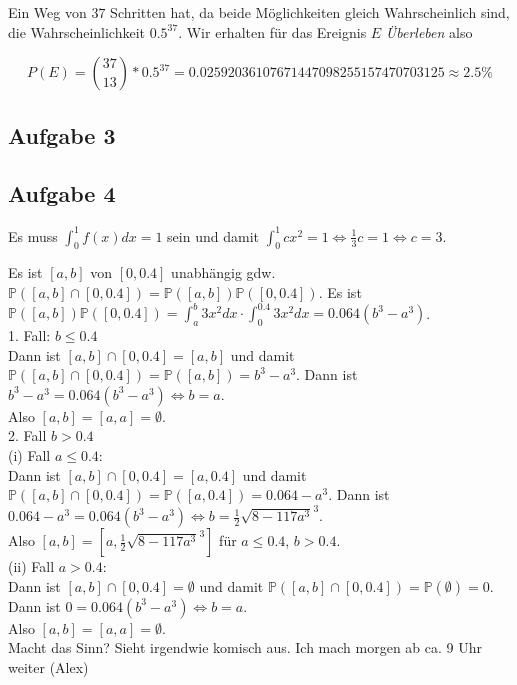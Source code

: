 \documentclass[11pt,a4paper,ngerman]{article}
\newcommand{\Prob}{\mathbb{P}}
\begin{document}
Ein Weg von $37$ Schritten hat, da beide Möglichkeiten gleich Wahrscheinlich sind, die Wahrscheinlichkeit $0.5^{37}$. Wir erhalten für
das Ereignis $E$ \emph{Überleben} also

\[
    P(E) = \binom{37}{13} * 0.5^{37} = 0.02592036107671447098255157470703125 \approx 2.5\%
\]

\subsection*{Aufgabe 3}


\subsection*{Aufgabe 4}

Es muss $\int_0^1 f(x) dx = 1$ sein und damit $\int_0^1 c x^2 = 1 \Leftrightarrow \frac{1}{3}c = 1 \Leftrightarrow c = 3$.

Es ist $[a,b]$ von $[0,0.4]$ unabhängig gdw. $\Prob([a,b] \cap [0,0.4]) = \Prob([a,b]) \Prob([0,0.4])$.
Es ist $\Prob([a,b]) \Prob([0,0.4]) = \int_a^b 3x^2 dx \cdot \int_0^{0.4} 3x^2 dx = 0.064 (b^3 - a^3)$. \\

1. Fall: $b \leq 0.4$ \\
Dann ist $[a,b] \cap [0,0.4] = [a,b]$ und damit $\Prob([a,b] \cap [0,0.4]) = \Prob([a,b]) = b^3 - a^3$.
Dann ist $ b^3 - a^3 =  0.064 (b^3 - a^3) \Leftrightarrow b = a$. \\
Also $[a,b] = [a,a] = \emptyset$. \\

2. Fall $b > 0.4$ \\
(i) Fall $a \leq 0.4$: \\
Dann ist $[a,b] \cap [0,0.4] = [a, 0.4]$ und damit  $\Prob([a,b] \cap [0,0.4]) = \Prob([a,0.4]) = 0.064 - a^3$.
Dann ist $ 0.064 - a^3 =  0.064 (b^3 - a^3) \Leftrightarrow b = \frac{1}{2} \sqrt{8-117a^3}^3$. \\
Also $[a,b] = [a,\frac{1}{2} \sqrt{8-117a^3}^3]$ für $a \leq 0.4$, $b > 0.4$. \\

(ii) Fall $a > 0.4$: \\
Dann ist $[a,b] \cap [0,0.4] = \emptyset$ und damit  $\Prob([a,b] \cap [0,0.4]) = \Prob(\emptyset) =0$.
Dann ist $ 0=  0.064 (b^3 - a^3) \Leftrightarrow b = a$. \\
Also $[a,b] = [a,a] = \emptyset$. \\

Macht das Sinn? Sieht irgendwie komisch aus.
Ich mach morgen ab ca. 9 Uhr weiter (Alex)


\label{LastPage}
\end{document}
